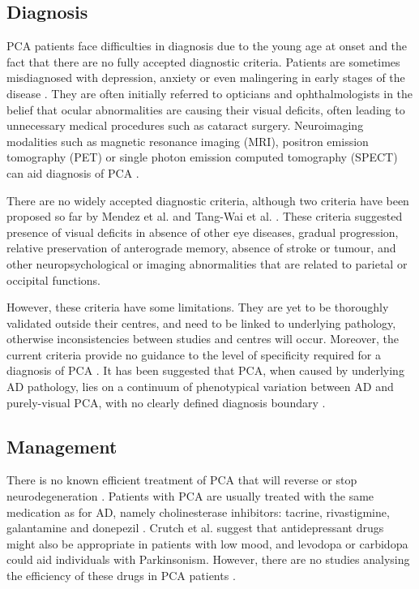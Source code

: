 \subsection{Diagnosis}
\label{sec:bckPcaDia}

PCA patients face difficulties in diagnosis due to the young age at onset and the fact that there are no fully accepted diagnostic criteria. Patients are sometimes misdiagnosed with depression, anxiety or even malingering in early stages of the disease \cite{crutch2012posterior}. They are often initially referred to opticians and ophthalmologists in the belief that ocular abnormalities are causing their visual deficits, often leading to unnecessary medical procedures such as cataract surgery. Neuroimaging modalities such as magnetic resonance imaging (MRI), positron emission tomography (PET) or single photon emission computed tomography (SPECT) can aid diagnosis of PCA \cite{goldstein2011posterior}. 

There are no widely accepted diagnostic criteria, although two criteria have been proposed so far by Mendez et al. \cite{mendez2002posterior} and Tang-Wai et al. \cite{tang2004clinical}. These criteria suggested presence of visual deficits in absence of other eye diseases, gradual progression, relative preservation of anterograde memory, absence of stroke or tumour, and other neuropsychological or imaging abnormalities that are related to parietal or occipital functions. 

However, these criteria have some limitations. They are yet to be thoroughly validated outside their centres, and need to be linked to underlying pathology, otherwise inconsistencies between studies and centres will occur. Moreover, the current criteria provide no guidance to the level of specificity required for a diagnosis of PCA \cite{crutch2012posterior}. It has been suggested that PCA, when caused by underlying AD pathology, lies on a continuum of phenotypical variation between AD and purely-visual PCA, with no clearly defined diagnosis boundary \cite{snowden2007cognitive, migliaccio2009clinical, lehmann2011basic}.

\subsection{Management}
\label{sec:bckPcaMan}

There is no known efficient treatment of PCA that will reverse or stop neurodegeneration \cite{borruat2013posterior}. Patients with PCA are usually treated with the same medication as for AD, namely cholinesterase inhibitors: tacrine, rivastigmine, galantamine and donepezil \cite{borruat2013posterior}. Crutch et al. \cite{crutch2012posterior} suggest that antidepressant drugs might also be appropriate in patients with low mood, and levodopa or carbidopa could aid individuals with Parkinsonism. However, there are no studies analysing the efficiency of these drugs in PCA patients \cite{borruat2013posterior}. 

